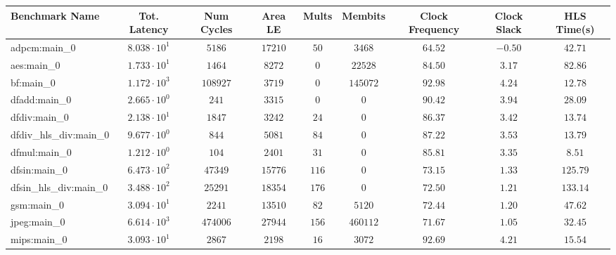 \begin{tabular}{|l|c|c|c|c|c|c|c|c|}
\hline
Benchmark Name          & Tot. Latency           & Num Cycles & Area LE    & Mults   & Membits    & Clock Frequency & Clock Slack & HLS Time(s) \\
\hline
adpcm:main\_0           & $ 8.038 \cdot 10^{1} $ & $ 5186   $ & $ 17210  $ & $ 50  $ & $ 3468   $ & $ 64.52       $ & $ -0.50   $ & $ 42.71   $ \\
aes:main\_0             & $ 1.733 \cdot 10^{1} $ & $ 1464   $ & $ 8272   $ & $ 0   $ & $ 22528  $ & $ 84.50       $ & $ 3.17    $ & $ 82.86   $ \\
bf:main\_0              & $ 1.172 \cdot 10^{3} $ & $ 108927 $ & $ 3719   $ & $ 0   $ & $ 145072 $ & $ 92.98       $ & $ 4.24    $ & $ 12.78   $ \\
dfadd:main\_0           & $ 2.665 \cdot 10^{0} $ & $ 241    $ & $ 3315   $ & $ 0   $ & $ 0      $ & $ 90.42       $ & $ 3.94    $ & $ 28.09   $ \\
dfdiv:main\_0           & $ 2.138 \cdot 10^{1} $ & $ 1847   $ & $ 3242   $ & $ 24  $ & $ 0      $ & $ 86.37       $ & $ 3.42    $ & $ 13.74   $ \\
dfdiv\_hls\_div:main\_0 & $ 9.677 \cdot 10^{0} $ & $ 844    $ & $ 5081   $ & $ 84  $ & $ 0      $ & $ 87.22       $ & $ 3.53    $ & $ 13.79   $ \\
dfmul:main\_0           & $ 1.212 \cdot 10^{0} $ & $ 104    $ & $ 2401   $ & $ 31  $ & $ 0      $ & $ 85.81       $ & $ 3.35    $ & $ 8.51    $ \\
dfsin:main\_0           & $ 6.473 \cdot 10^{2} $ & $ 47349  $ & $ 15776  $ & $ 116 $ & $ 0      $ & $ 73.15       $ & $ 1.33    $ & $ 125.79  $ \\
dfsin\_hls\_div:main\_0 & $ 3.488 \cdot 10^{2} $ & $ 25291  $ & $ 18354  $ & $ 176 $ & $ 0      $ & $ 72.50       $ & $ 1.21    $ & $ 133.14  $ \\
gsm:main\_0             & $ 3.094 \cdot 10^{1} $ & $ 2241   $ & $ 13510  $ & $ 82  $ & $ 5120   $ & $ 72.44       $ & $ 1.20    $ & $ 47.62   $ \\
jpeg:main\_0            & $ 6.614 \cdot 10^{3} $ & $ 474006 $ & $ 27944  $ & $ 156 $ & $ 460112 $ & $ 71.67       $ & $ 1.05    $ & $ 32.45   $ \\
mips:main\_0            & $ 3.093 \cdot 10^{1} $ & $ 2867   $ & $ 2198   $ & $ 16  $ & $ 3072   $ & $ 92.69       $ & $ 4.21    $ & $ 15.54   $ \\

\end{tabular}
